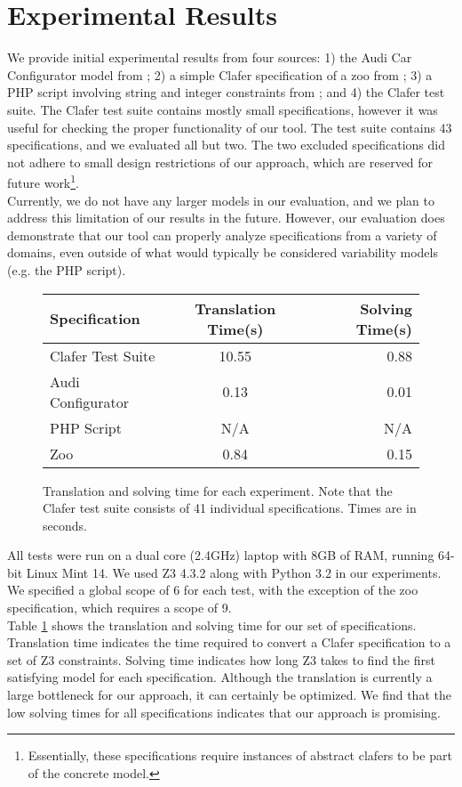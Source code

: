 \documentclass{easychair}
\begin{document}
\section{Experimental Results}
We provide initial experimental results from four sources: 1) the Audi Car Configurator model from \cite{Michel2012}; 2) a simple Clafer specification of a zoo from \cite{Liang}; 3) a PHP script involving string and integer constraints from \cite{Zheng2013}; and 4) the Clafer test suite. The Clafer test suite contains mostly small specifications, however it was useful for checking the proper functionality of our tool. The test suite contains 43 specifications, and we evaluated all but two. The two excluded specifications did not adhere to small design restrictions of our approach, which are reserved for future work\footnote{Essentially, these specifications require instances of abstract clafers to be part of the concrete model.}. \\
\indent Currently, we do not have any larger models in our evaluation, and we plan to address this limitation of our results in the future. However, our evaluation does demonstrate that our tool can properly analyze specifications from a variety of domains, even outside of what would typically be considered variability models (e.g. the PHP script).\\
\begin{figure}
\begin{center}
  \begin{tabular}{ l || c | r }
    \hline
    Specification & Translation Time(s) & Solving Time(s) \\ \hline \hline
    Clafer Test Suite & 10.55 & 0.88 \\ \hline
    Audi Configurator & 0.13 & 0.01 \\ \hline
    PHP Script & N/A & N/A \\ \hline
    Zoo & 0.84 & 0.15 \\
    \hline
  \end{tabular}
\end{center}
\label{resultstable}
\caption{Translation and solving time for each experiment. Note that the Clafer test suite consists of 41 individual specifications. Times are in seconds.}
\end{figure}
\indent All tests were run on a dual core (2.4GHz) laptop with 8GB of RAM, running 64-bit Linux Mint 14. We used Z3 4.3.2 along with Python 3.2 in our experiments. We specified a global scope of 6 for each test, with the exception of the zoo specification, which requires a scope of 9. \\
\indent Table \ref{resultstable} shows the translation and solving time for our set of specifications. Translation time indicates the time required to convert a Clafer specification to a set of Z3 constraints. Solving time indicates how long Z3 takes to find the first satisfying model for each specification. Although the translation is currently a large bottleneck for our approach, it can certainly be optimized. We find that the low solving times for all specifications indicates that our approach is promising.
\end{document}
